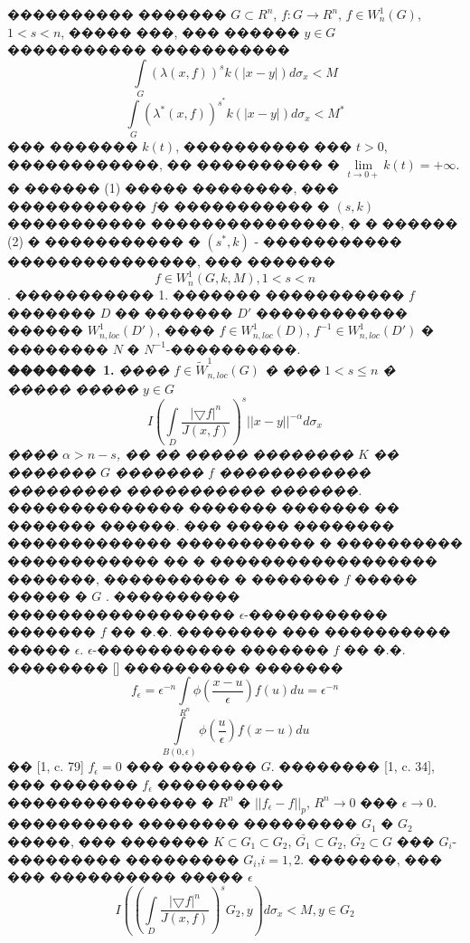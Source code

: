 \documentclass[a5paper, 12pt, openbib]{report}
\begin{document}
����������  ������� $G\subset R^n$, $f:G\to R^n$, $f\in W^{1}_{n}(G)$, $1<s<n$, ����� ���, ��� ������ $y\in G$ ����������� �����������
\begin{equation}
\int\limits_{G}(\lambda(x,f))^{s}k(|x-y|)d\sigma_{x}<M
\end{equation} 
\begin{equation}
\int\limits_{G}(\lambda^{*}(x,f))^{s^{*}}k(|x-y|)d\sigma_{x}<M^{*}
\end{equation} 
��� ������� $k(t)$, ���������� ��� $t>0$, ������������, �� ���������� � $\lim\limits_{t\to 0+}k(t)=+\infty$. �  ������ (1) ����� ��������, ��� ����������� $f$� ����������� � $(s,k)$ ����������� ���������������, � � ������ (2) � ����������� � $(s^{*},k)$ - ����������� ���������������, ��� ������� $$f\in W^{1}_{n}(G,k,M), 1<s<n$$.
����������� 1.  ������� ����������� $f$ ������� $D$ �� ������� $D'$ ������������ ������ $W^{1}_{n,loc}(D')$, ���� $f \in W^{1}_{n,loc}(D)$, $f^{-1} \in W^{1}_{n,loc}(D')$   � �������� $N$ � $N^{-1}$-����������.\\
\textbf{�������~1.} {\it ���� $f\in\widetilde{W}_{n,loc}^1(G) $ � ��� $1<s\leq n$ � ����� ����� $y\in G$ 
\begin{equation}
I\left(
\int\limits_D\frac{|\bigtriangledown f|^{n}}{J(x,f)}
\right)^{s}||x-y||^{-\alpha}d\sigma_{x}
\end{equation}
���� $\alpha>n-s$, �� �� ����� �������� $K$ �� ������� $G$ �������  $f$ ������������ ��������� ����������� �������.} �������������� ������� ������� �� ������� ������. ��� ����� �������� ������������� ����������� � ���������� ������������ �� $�$ ������������������ �������, ���������� � ������� $f$  ����� ����� � $G$ . ���������� ������������������ $\epsilon$-����������� ������� $f$  �� �.�. �������� ��� ���������� ����� $\epsilon$. $\epsilon$-����������� ������� $f$ �� �.�. �������� [] ���������� ������� 
$$
f_{\epsilon}=\epsilon^{-n}\int\limits_{R^n}\phi\left(\frac{x-u}{\epsilon}\right)f(u)du=\epsilon^{-n}$$
$$\int\limits_{B(0,\epsilon)}\phi\left(\frac{u}{\epsilon}\right)f(x-u)du
$$
�� [1, c. 79] $f_{\epsilon}=0$ ��� ������� $G$. �������� [1, c. 34], ��� ������� $f_{\epsilon}$ ���������� ��������������� � $R^n$ � $||f_{\epsilon}-f||_p$, $R^{n}\to 0$  ��� $\epsilon\to 0$. ���������� �������� ��������� $G_1$  � $G_2$ �����, ��� �������  $K\subset G_{1} \subset G_{2}$, $\overline{G_1}\subset G_{2}$, $\overline{G_2}\subset G$ ��� $G_i$- ��������� ��������� $G_i$,$i=1,2$.
 	�������, ��� ��� ���������� ����� $\epsilon$
 	$$I\left(\left(
\int\limits_D\frac{|\bigtriangledown f|^{n}}{J(x,f)}
\right)^{s}G_{2},y\right) d\sigma_{x}<M, y\in G_2$$
\end{document}
